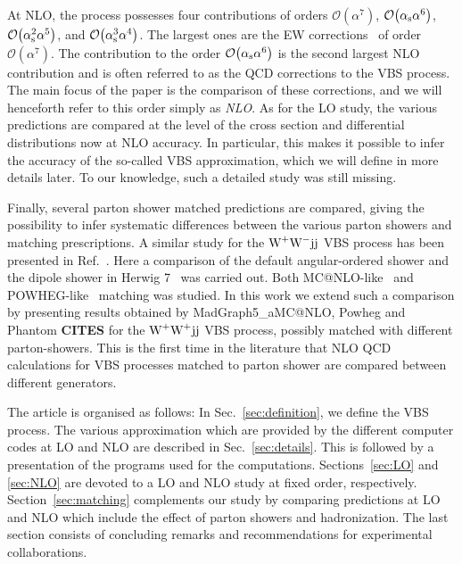 At NLO, the process possesses four contributions of orders $\mathcal{O}{\left(\alpha^{7}\right)}$, $\mathcal{O}{\left(\alpha_\text{s}\alpha^{6}\right)}$, $\mathcal{O}{\left(\alpha_\text{s}^{2}\alpha^{5}\right)}$, and $\mathcal{O}{\left(\alpha_\text{s}^{3}\alpha^{4}\right)}$.
The largest ones are the EW corrections~\cite{Biedermann:2017bss,Biedermann:2016yds} of order $\mathcal{O}{\left(\alpha^{7}\right)}$.
The contribution to the order $\mathcal{O}{\left(\alpha_\text{s}\alpha^{6}\right)}$ is the second largest NLO contribution and is often referred to as the QCD corrections to the VBS process.
The main focus of the paper is the comparison of these corrections, and we will henceforth refer to this order simply as \emph{NLO}.
As for the LO study, the various predictions are compared at the level of the cross section and differential distributions now at NLO accuracy.
In particular, this makes it possible to infer the accuracy of the so-called VBS approximation, which we will define in more details later.
To our knowledge, such a detailed study was still missing. 

Finally, several parton shower matched predictions are compared, giving the possibility to infer systematic differences between the various parton showers and matching prescriptions.
A similar study for the $\text{W}^+ \text{W}^- \text{j} \text{j}$ VBS process has been presented in
Ref.~\cite{Rauch:2016upa}. Here a comparison of the default angular-ordered shower and the dipole
shower  in {\sc Herwig 7}~\cite{Bellm:2015jjp} was carried out. Both {\sc MC@NLO}-like~\cite{Frixione:2002ik} and {\sc POWHEG}-like~\cite{Nason:2004rx,Frixione:2007vw} matching was studied. In this work we extend such a comparison by presenting 
results obtained by {\sc MadGraph5\_aMC@NLO}, {\sc Powheg} and {\sc Phantom} {\bf CITES} for the $\text{W}^+ \text{W}^+ \text{j} \text{j}$ VBS process, possibly matched with different parton-showers.
This is the first time in the literature that NLO QCD calculations for VBS processes matched to parton shower are compared between different generators. 

The article is organised as follows:
In Sec.~\ref{sec:definition}, we define the VBS process.
The various approximation which are provided by the different computer codes at LO and NLO are described in Sec.~\ref{sec:details}.
This is followed by a presentation of the programs used for the computations.
Sections~\ref{sec:LO} and \ref{sec:NLO} are devoted to a LO and NLO study at fixed order, respectively.
Section~\ref{sec:matching} complements our study by comparing predictions at LO and NLO which include the effect of parton showers and hadronization.
The last section consists of concluding remarks and recommendations for experimental collaborations.
